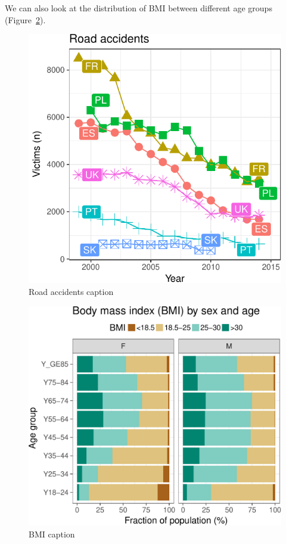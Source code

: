 We can also look at the distribution of BMI between different age groups (Figure~\ref{fig:bmi}).


\begin{figure}
\begin{center}
\includegraphics{2015-manu-roadacc-1}
\end{center}
\caption{Road accidents caption}
\label{fig:roadaccidents}
\end{figure}


\begin{figure}
\begin{center}
\includegraphics{2015-manu-bmi-1}
\end{center}
\caption{BMI caption}
\label{fig:bmi}
\end{figure}


